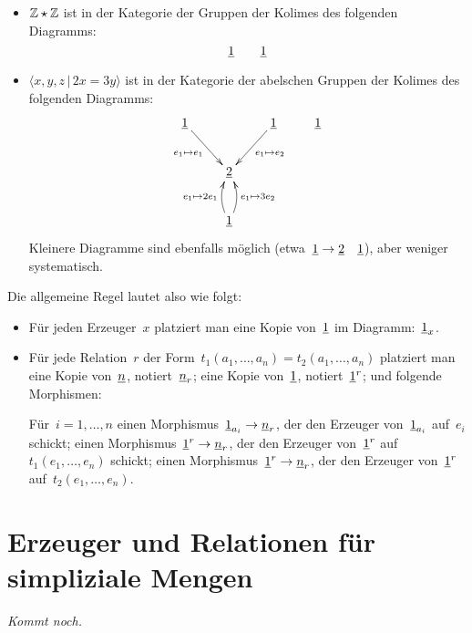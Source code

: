 \documentclass{uebblatt}
\begin{document}
\begin{itemize}
\item $\mathbb{Z} \star \mathbb{Z}$ ist in der Kategorie der Gruppen der Kolimes des
folgenden Diagramms:
\[ \underline{1} \qquad \underline{1} \]
\item $\langle x,y,z \,|\, 2x = 3y \rangle$ ist in der Kategorie der abelschen
Gruppen der Kolimes des folgenden Diagramms:
\[ \xymatrix{
  \ul{1} \ar[rd]_{e_1 \mapsto e_1} && \ul{1} \ar[ld]^{e_1 \mapsto e_2} & \ul{1} \\
  & \ul{2} \\
  & \ul{1} \ar@/^/[u]^{e_1 \mapsto 2e_1} \ar@/_/[u]_{e_1 \mapsto 3e_2}
} \]
Kleinere Diagramme sind ebenfalls möglich (etwa~$\underline{1} \to \underline{2} \quad
\underline{1}$), aber weniger systematisch.
\end{itemize}

Die allgemeine Regel lautet also wie folgt:
\begin{itemize}
\item Für jeden Erzeuger~$x$ platziert man eine Kopie von~$\underline{1}$ im
Diagramm:~$\underline{1}_x$.
\item Für jede Relation~$r$ der Form~$t_1(a_1,\ldots,a_n) =
t_2(a_1,\ldots,a_n)$ platziert man eine Kopie von~$\underline{n}$,
notiert~$\underline{n}_r$; eine Kopie von~$\underline{1}$, notiert~$\underline{1}^r$; und
folgende Morphismen:

Für~$i=1,\ldots,n$ einen Morphismus~$\underline{1}_{a_i} \to \underline{n}_r$, der
den Erzeuger von~$\underline{1}_{a_i}$ auf~$e_i$ schickt; einen
Morphismus~$\underline{1}^r \to \underline{n}_r$, der den Erzeuger von~$\underline{1}^r$
auf~$t_1(e_1,\ldots,e_n)$ schickt; einen Morphismus~$\underline{1}^r \to \underline{n}_r$,
der den Erzeuger von~$\underline{1}^r$ auf~$t_2(e_1,\ldots,e_n)$.
\end{itemize}


\section*{Erzeuger und Relationen für simpliziale Mengen}

\emph{Kommt noch.}
\end{document}
